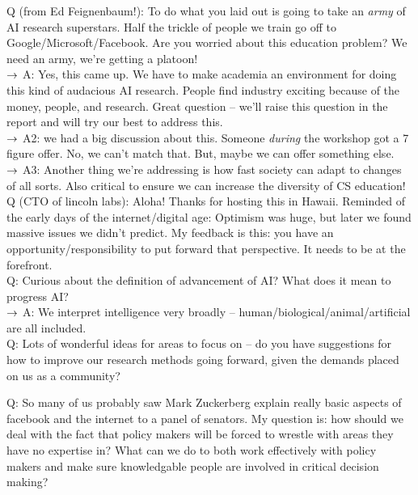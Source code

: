 Q (from Ed Feignenbaum!): To do what you laid out is going to take an {\it army} of AI research superstars. Half the trickle of people we train go off to Google/Microsoft/Facebook. Are you worried about this education problem? We need an army, we're getting a platoon! \\

$\rightarrow$ A: Yes, this came up. We have to make academia an environment for doing this kind of audacious AI research. People find industry exciting because of the money, people, and research. Great question -- we'll raise this question in the report and will try our best to address this. \\

$\rightarrow$ A2: we had a big discussion about this. Someone {\it during} the workshop got a 7 figure offer. No, we can't match that. But, maybe we can offer something else. \\

$\rightarrow$ A3: Another thing we're addressing is how fast society can adapt to changes of all sorts. Also critical to ensure we can increase the diversity of CS education! \\

Q (CTO of lincoln labs): Aloha! Thanks for hosting this in Hawaii. Reminded of the early days of the internet/digital age: Optimism was huge, but later we found massive issues we didn't predict. My feedback is this: you have an opportunity/responsibility to put forward that perspective. It needs to be at the forefront. \\

Q: Curious about the definition of advancement of AI? What does it mean to progress AI? \\

$\rightarrow$ A: We interpret intelligence very broadly -- human/biological/animal/artificial are all included. \\





Q: Lots of wonderful ideas for areas to focus on -- do you have suggestions for how to improve our research methods going forward, given the demands placed on us as a community?


Q: So many of us probably saw Mark Zuckerberg explain really basic aspects of facebook and the internet to a panel of senators. My question is: how should we deal with the fact that policy makers will be forced to wrestle with areas they have no expertise in? What can we do to both work effectively with policy makers and make sure knowledgable people are involved in critical decision making?